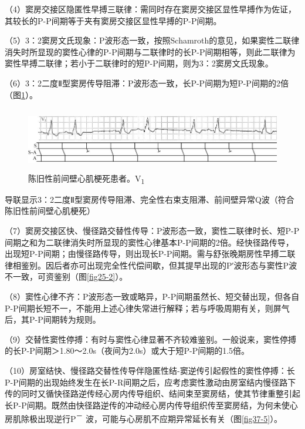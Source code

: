（4）窦房交接区隐匿性早搏三联律：需同时存在窦房交接区显性早搏作为佐证，其较长的P-P间期等于夹有窦房交接区显性早搏的P-P间期。

（5）3：2窦房文氏现象：P波形态一致，按照Schamroth的意见，如果窦性二联律消失时所显现的窦性心律的P-P间期与二联律时的长P-P间期相等，则此二联律为窦性早搏二联律；若小于二联律时的短P-P间期，则为3：2窦房文氏现象。

（6）3：2二度Ⅱ型窦房传导阻滞：P波形态一致，长P-P间期为短P-P间期的2倍（图\ref{fig37-4}）。

\begin{figure}[!htbp]
 \centering
 \includegraphics[width=5.78125in,height=1.08333in]{./images/Image00598.jpg}
 \captionsetup{justification=centering}
 \caption{陈旧性前间壁心肌梗死患者。V\textsubscript{1}}
 \label{fig37-4}
  \end{figure} 
导联显示3：2二度Ⅱ型窦房传导阻滞、完全性右束支阻滞、前间壁异常Q波（符合陈旧性前间壁心肌梗死）

（7）窦房交接区快、慢径路交替性传导：P波形态一致，窦性二联律时长、短P-P间期之和为二联律消失时所显现的窦性心律基本P-P间期的2倍。经快径路传导，出现短P-P间期；由慢径路传导，则出现长P-P间期。需与舒张晚期房性早搏二联律相鉴别。因后者亦可出现完全性代偿间歇，但其提早出现的P′波形态与窦性P波不一致，可资鉴别（图\ref{fig25-2}）。

（8）窦性心律不齐：P波形态一致或略异，P-P间期虽然长、短交替出现，但各自P-P间期长短不一，不能用上述心律失常进行解释；若与呼吸周期有关，则屏气后，其P-P间期转为规则。

（9）交替性窦性停搏：有时与窦性心律显著不齐较难鉴别。一般说来，窦性停搏的长P-P间期＞1.80～2.0s（夜间为2.0s）或大于短P-P间期的1.5倍。

（10）房室结快、慢径路交替性传导伴隐匿性结-窦逆传引起假性的窦性停搏：长P-P间期的出现始终发生在长P-R间期之后，应考虑窦性激动由房室结内慢径路下传的同时又循快径路逆传经心房内传导组织、结间束至窦房结，使其节律重整引起长P-P间期。既然由快径路逆传的冲动经心房内传导组织传至窦房结，为何未使心房肌除极出现逆行P\textsuperscript{－}
波，可能与心房肌不应期异常延长有关（图\ref{fig37-5}）。

